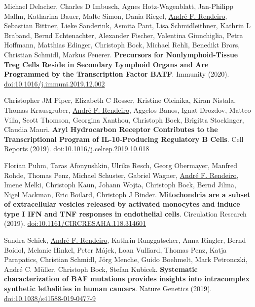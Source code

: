 \documentclass[11pt,a4paper,roman]{moderncv} %
\begin{document}
\begin{etaremune}[leftmargin=1.0cm, itemindent=0pt, topsep=10pt, itemsep=2pt, partopsep=0pt, parsep=0pt]
        \item Michael Delacher, Charles D Imbusch, Agnes Hotz-Wagenblatt, Jan-Philipp Mallm, Katharina Bauer, Malte Simon, Dania Riegel, \underline{André F. Rendeiro}, Sebastian Bittner, Lieke Sanderink, Asmita Pant, Lisa Schmidleithner, Kathrin L Braband, Bernd Echtenachter, Alexander Fischer, Valentina Giunchiglia, Petra Hoffmann, Matthias Edinger, Christoph Bock, Michael Rehli, Benedikt Brors, Christian Schmidl, Markus Feuerer. \textbf{Precursors for Nonlymphoid-Tissue Treg Cells Reside in Secondary Lymphoid Organs and Are Programmed by the Transcription Factor BATF}. Immunity (2020).
        \href{https://dx.doi.org/10.1016/j.immuni.2019.12.002}{doi:10.1016/j.immuni.2019.12.002}

        \item Christopher JM Piper, Elizabeth C Rosser, Kristine Oleinika, Kiran Nistala, Thomas Krausgruber, \underline{André F. Rendeiro}, Aggelos Banos, Ignat Drozdov, Matteo Villa, Scott Thomson, Georgina Xanthou, Christoph Bock, Brigitta Stockinger, Claudia Mauri. \textbf{Aryl Hydrocarbon Receptor Contributes to the Transcriptional Program of IL-10-Producing Regulatory B Cells}. Cell Reports (2019).
        \href{https://dx.doi.org/10.1016/j.celrep.2019.10.018}{doi:10.1016/j.celrep.2019.10.018}

        \item Florian Puhm, Taras Afonyushkin, Ulrike Resch, Georg Obermayer, Manfred Rohde, Thomas Penz, Michael Schuster, Gabriel Wagner, \underline{André F. Rendeiro}, Imene Melki, Christoph Kaun, Johann Wojta, Christoph Bock, Bernd Jilma, Nigel Mackman, Eric Boilard, Christoph J Binder. \textbf{Mitochondria are a subset of extracellular vesicles released by activated monocytes and induce type I IFN and TNF responses in endothelial cells}. Circulation Research (2019).
        \href{https://dx.doi.org/10.1161/CIRCRESAHA.118.314601}{doi:10.1161/CIRCRESAHA.118.314601}

        \item Sandra Schick, \underline{André F. Rendeiro}, Kathrin Runggatscher, Anna Ringler, Bernd Boidol, Melanie Hinkel, Peter Májek, Loan Vulliard, Thomas Penz, Katja Parapatics, Christian Schmidl, Jörg Menche, Guido Boehmelt, Mark Petronczki, André C. Müller, Christoph Bock, Stefan Kubicek. \textbf{Systematic characterization of BAF mutations provides insights into intracomplex synthetic lethalities in human cancers}. Nature Genetics (2019).
        \href{https://dx.doi.org/10.1038/s41588-019-0477-9}{doi:10.1038/s41588-019-0477-9}


\end{etaremune}
\end{document}
